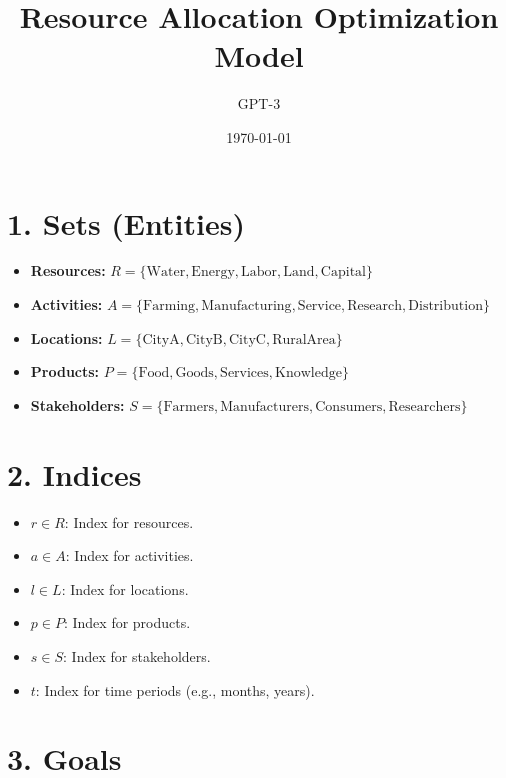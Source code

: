 \documentclass{article}
\title{Resource Allocation Optimization Model}
\author{GPT-3}
\date{\today}
\begin{document}
\maketitle
\tableofcontents

\section{1. Sets (Entities)}

\begin{itemize}
    \item \textbf{Resources:} $R = \{\text{Water}, \text{Energy}, \text{Labor}, \text{Land}, \text{Capital}\}$
    \item \textbf{Activities:} $A = \{\text{Farming}, \text{Manufacturing}, \text{Service}, \text{Research}, \text{Distribution}\}$
    \item \textbf{Locations:} $L = \{\text{CityA}, \text{CityB}, \text{CityC}, \text{RuralArea}\}$
    \item \textbf{Products:} $P = \{\text{Food}, \text{Goods}, \text{Services}, \text{Knowledge}\}$
    \item \textbf{Stakeholders:} $S = \{\text{Farmers}, \text{Manufacturers}, \text{Consumers}, \text{Researchers}\}$
\end{itemize}

\section{2. Indices}

\begin{itemize}
    \item $r \in R$: Index for resources.
    \item $a \in A$: Index for activities.
    \item $l \in L$: Index for locations.
    \item $p \in P$: Index for products.
    \item $s \in S$: Index for stakeholders.
    \item $t$: Index for time periods (e.g., months, years).
\end{itemize}

\section{3. Goals}
\end{document}

